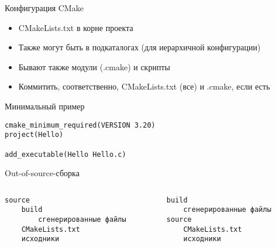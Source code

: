 \documentclass{../../slides-style}
\begin{document}
    \begin{frame}{Конфигурация CMake}
        \begin{itemize}
            \item CMakeLists.txt в корне проекта
            \item Также могут быть в подкаталогах (для иерархичной конфигурации)
            \item Бывают также модули (.cmake) и скрипты
            \item Коммитить, соответственно, CMakeLists.txt (все) и .cmake, если есть
        \end{itemize}
    \end{frame}

    \begin{frame}[fragile]{Минимальный пример}
        \begin{verbatim}
cmake_minimum_required(VERSION 3.20)
project(Hello)

add_executable(Hello Hello.c)
        \end{verbatim}
    \end{frame}

    \begin{frame}[fragile]{Out-of-source-сборка}
        \begin{columns}
            \begin{column}{0.5\textwidth}
                \begin{verbatim}
source
    build
        сгенерированные файлы
    CMakeLists.txt
    исходники
                \end{verbatim}
            \end{column}
            \begin{column}{0.5\textwidth}
                \begin{verbatim}
build
    сгенерированные файлы
source
    CMakeLists.txt
    исходники
                \end{verbatim}
            \end{column}
        \end{columns}
    \end{frame}
\end{document}
